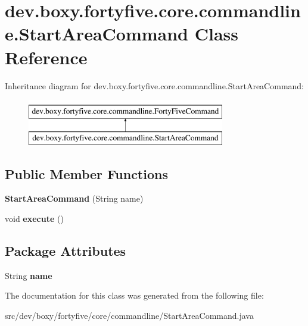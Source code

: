 \hypertarget{classdev_1_1boxy_1_1fortyfive_1_1core_1_1commandline_1_1_start_area_command}{
\section{dev.boxy.fortyfive.core.commandline.StartAreaCommand Class Reference}
\label{d6/d98/classdev_1_1boxy_1_1fortyfive_1_1core_1_1commandline_1_1_start_area_command}
}
Inheritance diagram for dev.boxy.fortyfive.core.commandline.StartAreaCommand:\begin{figure}[H]
\begin{center}
\leavevmode
\includegraphics[height=2.000000cm]{d6/d98/classdev_1_1boxy_1_1fortyfive_1_1core_1_1commandline_1_1_start_area_command}
\end{center}
\end{figure}
\subsection*{Public Member Functions}
\begin{DoxyCompactItemize}
\item 
\hypertarget{classdev_1_1boxy_1_1fortyfive_1_1core_1_1commandline_1_1_start_area_command_a60fcae48fee3e89276e18111ee2113a8}{
{\bfseries StartAreaCommand} (String name)}
\label{d6/d98/classdev_1_1boxy_1_1fortyfive_1_1core_1_1commandline_1_1_start_area_command_a60fcae48fee3e89276e18111ee2113a8}

\item 
\hypertarget{classdev_1_1boxy_1_1fortyfive_1_1core_1_1commandline_1_1_start_area_command_a51cff1d4811638a1ad0f0ccfd059fa29}{
void {\bfseries execute} ()}
\label{d6/d98/classdev_1_1boxy_1_1fortyfive_1_1core_1_1commandline_1_1_start_area_command_a51cff1d4811638a1ad0f0ccfd059fa29}

\end{DoxyCompactItemize}
\subsection*{Package Attributes}
\begin{DoxyCompactItemize}
\item 
\hypertarget{classdev_1_1boxy_1_1fortyfive_1_1core_1_1commandline_1_1_start_area_command_a3c112aa13b9f6f74e1f362dcd461fc12}{
String {\bfseries name}}
\label{d6/d98/classdev_1_1boxy_1_1fortyfive_1_1core_1_1commandline_1_1_start_area_command_a3c112aa13b9f6f74e1f362dcd461fc12}

\end{DoxyCompactItemize}


The documentation for this class was generated from the following file:\begin{DoxyCompactItemize}
\item 
src/dev/boxy/fortyfive/core/commandline/StartAreaCommand.java\end{DoxyCompactItemize}
